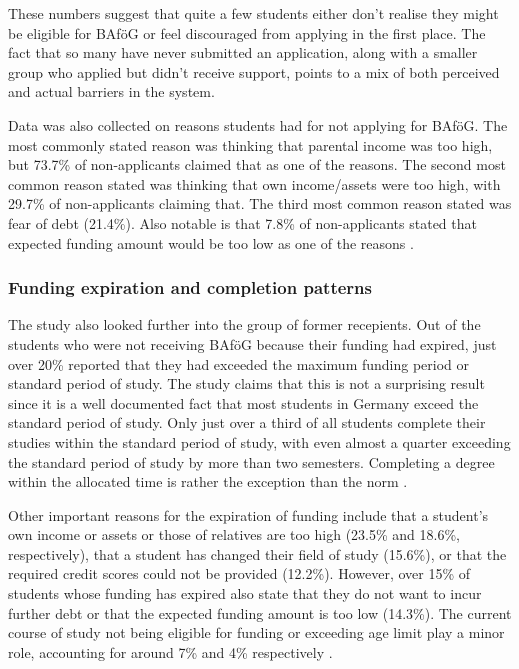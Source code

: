These numbers suggest that quite a few students either don’t realise they might be eligible for BAföG or feel discouraged from applying in the first place. The fact that so many have never submitted an application, along with a smaller group who applied but didn’t receive support, points to a mix of both perceived and actual barriers in the system.

Data was also collected on reasons students had for not applying for BAföG. The most commonly stated reason was thinking that parental income was too high, but 73.7\% of non-applicants claimed that as one of the reasons. The second most common reason stated was thinking that own income/assets were too high, with 29.7\% of non-applicants claiming that. The third most common reason stated was fear of debt (21.4\%). Also notable is that 7.8\% of non-applicants stated that expected funding amount would be too low as one of the reasons \citep{kroher_studierendenbefragung_2023}.

\subsubsection*{Funding expiration and completion patterns}
\label{subsection:funding-expiration-and-completion-patterns}

The study also looked further into the group of former recepients. Out of the students who were not receiving BAföG because their funding had expired, just over 20\% reported that they had exceeded the maximum funding period or standard period of study. The study claims that this is not a surprising result since it is a well documented fact that most students in Germany exceed the standard period of study. Only just over a third of all students complete their studies within the standard period of study, with even almost a quarter exceeding the standard period of study by more than two semesters. Completing a degree within the allocated time is rather the exception than the norm \citep{kroher_studierendenbefragung_2023}.

Other important reasons for the expiration of funding include that a student's own income or assets or those of relatives are too high (23.5\% and 18.6\%, respectively), that a student has changed their field of study (15.6\%), or that the required credit scores could not be provided (12.2\%). However, over 15\% of students whose funding has expired also state that they do not want to incur further debt or that the expected funding amount is too low (14.3\%). The current course of study not being eligible for funding or exceeding age limit play a minor role, accounting for around 7\% and 4\% respectively \citep{kroher_studierendenbefragung_2023}.


